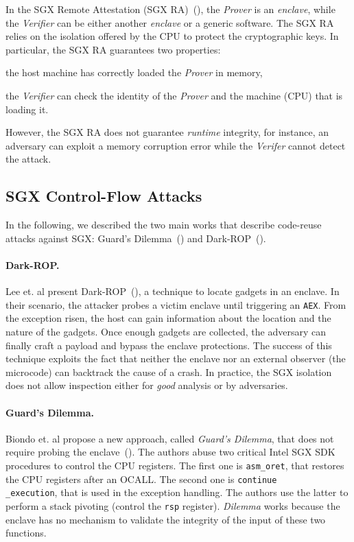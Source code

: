 In the SGX Remote Attestation (SGX RA)~(\cite{vill2017sgx}), the 
\emph{Prover} is an \emph{enclave}, while the \emph{Verifier} can be either 
another \emph{enclave} or a generic software.
The SGX RA relies on the isolation offered by the CPU to protect the 
cryptographic keys. 
In particular, the SGX RA guarantees two properties:
\begin{enumerate*}[label=(\roman*)]
	\item the host machine has correctly loaded the \emph{Prover} in memory,
	\item the \emph{Verifier} can check the identity of the 
	\emph{Prover} and the machine (\ie CPU) that is loading it.
\end{enumerate*}
However, the SGX RA does not guarantee \emph{runtime} integrity, for instance, 
an adversary can exploit a memory corruption error while the 
\emph{Verifer} cannot detect the attack.


\subsection{SGX Control-Flow Attacks}

In the following, we described the two main works that describe code-reuse 
attacks against SGX: Guard's Dilemma~(\cite{biondo2018guard}) and 
Dark-ROP~(\cite{lee2017hacking}).

\paragraph{Dark-ROP.}
Lee et. al present Dark-ROP~(\cite{lee2017hacking}), a technique to locate 
gadgets in an enclave.
In their scenario, the attacker probes
a victim enclave until triggering an \texttt{AEX}.
From the exception risen, the host can gain information about the location and 
the nature of the gadgets.
Once enough gadgets are collected, the adversary can finally craft a payload 
and bypass the enclave protections.
The success of this technique exploits the fact that neither the enclave 
nor an external observer (\eg the microcode) can backtrack the cause of a 
crash.
In practice, the SGX isolation does not allow inspection either for 
\emph{good} analysis or by adversaries.

\paragraph{Guard's Dilemma.}
Biondo et. al propose a new approach, called \emph{Guard's Dilemma}, that does 
not require probing the enclave~(\cite{biondo2018guard}).
The authors abuse two critical Intel SGX SDK procedures to control the CPU 
registers.
The first one is \texttt{asm\_oret}, that restores the CPU registers after an  
OCALL.
The second one is \texttt{continue\\\_execution}, that is used in the exception
handling.
The authors use the latter to perform a stack pivoting (\ie control the 
\texttt{rsp} register).
\emph{Dilemma} works because the enclave has no mechanism to validate
the integrity of the input of these two functions.
